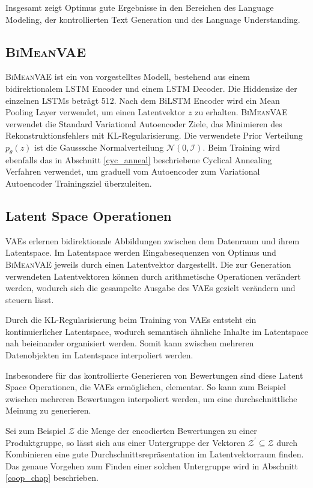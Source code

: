 Insgesamt zeigt Optimus gute Ergebnisse in den Bereichen des Language Modeling, der kontrollierten Text Generation und des Language Understanding.



\pagebreak
\subsection{\textsc{BiMeanVAE}}
\textsc{BiMeanVAE} ist ein von \citep{coop} vorgestelltes Modell, bestehend aus einem bidirektionalem LSTM Encoder und einem LSTM Decoder. 
Die Hiddensize der einzelnen LSTMs beträgt 512. Nach dem BiLSTM Encoder wird ein Mean Pooling Layer verwendet, um einen Latentvektor $z$ zu erhalten.
\textsc{BiMeanVAE} verwendet die Standard Variational Autoencoder Ziele, das Minimieren des Rekonstruktionsfehlers mit KL-Regularisierung.
Die verwendete Prior Verteilung $p_\theta(z)$ ist die Gausssche Normalverteilung $\mathcal{N}(0,\mathcal{I})$. 
Beim Training wird ebenfalls das in Abschnitt \ref{cyc_anneal} beschriebene Cyclical Annealing Verfahren verwendet, um graduell vom Autoencoder zum Variational Autoencoder Trainingsziel überzuleiten.


\subsection{Latent Space Operationen}
VAEs erlernen bidirektionale Abbildungen zwischen dem Datenraum und ihrem Latentspace. 
Im Latentspace werden Eingabesequenzen von Optimus und \textsc{BiMeanVAE} jeweils durch einen Latentvektor dargestellt.
Die zur Generation verwendeten Latentvektoren können durch arithmetische Operationen verändert werden, wodurch sich die gesampelte Ausgabe des VAEs gezielt verändern und steuern lässt.

Durch die KL-Regularisierung beim Training von VAEs entsteht ein kontinuierlicher Latentspace, wodurch semantisch ähnliche Inhalte im Latentspace nah beieinander organisiert werden.
Somit kann zwischen mehreren Datenobjekten im Latentspace interpoliert werden.

Insbesondere für das kontrollierte Generieren von Bewertungen sind diese Latent Space Operationen, die VAEs ermöglichen, elementar.
So kann zum Beispiel zwischen mehreren Bewertungen interpoliert werden, um eine durchschnittliche Meinung zu generieren.

Sei zum Beispiel $\mathcal{Z}$ die Menge der encodierten Bewertungen zu einer Produktgruppe, so lässt sich aus einer Untergruppe der Vektoren $\mathcal{Z}^{'} \subseteq \mathcal{Z}$ durch Kombinieren eine gute Durchschnittsrepräsentation im Latentvektorraum finden.
Das genaue Vorgehen zum Finden einer solchen Untergruppe wird in Abschnitt \ref{coop_chap} beschrieben.
\pagebreak
